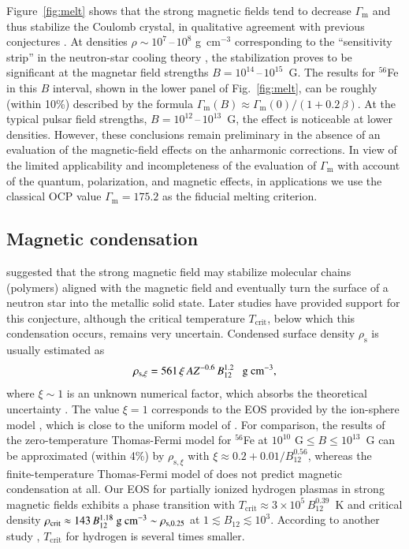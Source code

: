 \documentclass[traditabstract]{aa}
\newcommand{\beq}{\begin{equation}}
\newcommand{\eeq}{\end{equation}}
\newcommand{\Gammam}{\Gamma_\mathrm{m}}
\newcommand{\gcc}{\mbox{g~cm$^{-3}$}}
\newcommand{\rhos}{\rho_\mathrm{s}}
\begin{document}
Figure~\ref{fig:melt} shows that the strong
magnetic fields tend to decrease $\Gammam$ and thus
stabilize the Coulomb crystal, in qualitative agreement with
previous conjectures
\citep{Ruderman71,KaplanGlasser,UsovGU,Lai01}. 
At densities
$\rho\sim10^7$\,--\,$10^8$ \gcc{} corresponding to the
``sensitivity strip'' in the neutron-star cooling theory
\citep{YakovlevPethick}, the stabilization proves to be
significant at the magnetar field strengths
$B=10^{14}$\,--\,$10^{15}$~G. 
The results for $^{56}$Fe in this $B$ interval, shown in the
lower panel of Fig.~\ref{fig:melt}, can be roughly (within
10\%) described by the formula
$\Gammam(B)\approx\Gammam(0)/(1+0.2\,\beta)$.
At the typical pulsar field
strengths, $B=10^{12}$\,--\,$10^{13}$~G, the effect is
noticeable at lower densities. However, these conclusions
remain preliminary in the absence of an evaluation of the
magnetic-field effects on the anharmonic corrections.
In view of the limited applicability and incompleteness of
the evaluation of $\Gammam$ with account of the
quantum, polarization, and magnetic effects, in applications
we use the classical OCP value $\Gammam=175.2$ as
the fiducial melting criterion.

\subsection{Magnetic condensation}
\label{sect:cond}

\citet{Ruderman71} suggested that the strong magnetic field
may
stabilize molecular chains (polymers) aligned with the
magnetic field and eventually
 turn the surface of a neutron star into the metallic
solid state. Later studies have provided support for this
conjecture, although the critical temperature
$T_\mathrm{crit}$, below which this condensation occurs,
remains 
very
 uncertain. Condensed surface density $\rhos$
is usually estimated as
\beq
    \rho_{\mathrm{s},\xi} = 
           561\,\xi\,AZ^{-0.6}\,B_{12}^{1.2}
          \textrm{~~~\gcc},
\label{rho_s} 
\eeq 
where $\xi\sim1$ is an unknown numerical factor, which
absorbs the theoretical uncertainty
\citep{Lai01,MedinLai06}. The value $\xi=1$ corresponds to
the EOS provided by the ion-sphere model \citep{Salpeter61},
which is close to the uniform model of
\citet{Fushiki-ea}.
For comparison, the results of the zero-temperature
Thomas-Fermi model for $^{56}$Fe at
$10^{10}\mbox{~G}\leqslant B\leqslant 10^{13}$~G
\citep{Rognvaldsson-ea} can be 
approximated  (within 4\%) by $\rho_{\mathrm{s},\xi}$
with $\xi\approx0.2+0.01/B_{12}^{0.56}$, whereas the
finite-temperature Thomas-Fermi model of
\citet{Thorolfsson-ea} does not predict magnetic
condensation at all.
Our EOS for partially ionized hydrogen plasmas in strong
magnetic fields \citep{PCS,PC04} exhibits a phase transition
with  $T_\mathrm{crit}\approx3\times10^5\,B_{12}^{0.39}$~K
and critical density $\rho_\mathrm{crit} \approx
143\,B_{12}^{1.18}\mbox{~\gcc} \sim \rho_\mathrm{s,0.25}$ at
$1\lesssim B_{12}\lesssim10^3$. According to another study
\citep{LaiSalpeter97,Lai01}, $T_\mathrm{crit}$ for hydrogen
is several times smaller.
\end{document}
